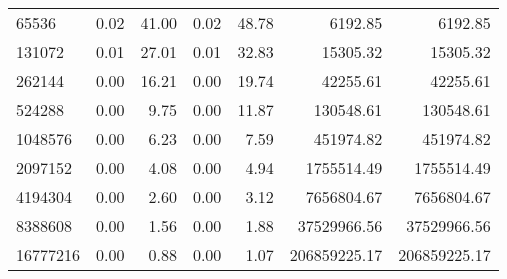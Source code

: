 \begin{tabular}{lrrrrrr}
65536    &        0.02 &         41.00 &           0.02 &        48.78 &          6192.85 &         6192.85 \\
131072   &        0.01 &         27.01 &           0.01 &        32.83 &         15305.32 &        15305.32 \\
262144   &        0.00 &         16.21 &           0.00 &        19.74 &         42255.61 &        42255.61 \\
524288   &        0.00 &          9.75 &           0.00 &        11.87 &        130548.61 &       130548.61 \\
1048576  &        0.00 &          6.23 &           0.00 &         7.59 &        451974.82 &       451974.82 \\
2097152  &        0.00 &          4.08 &           0.00 &         4.94 &       1755514.49 &      1755514.49 \\
4194304  &        0.00 &          2.60 &           0.00 &         3.12 &       7656804.67 &      7656804.67 \\
8388608  &        0.00 &          1.56 &           0.00 &         1.88 &      37529966.56 &     37529966.56 \\
16777216 &        0.00 &          0.88 &           0.00 &         1.07 &     206859225.17 &    206859225.17 \\
\bottomrule
\end{tabular}
